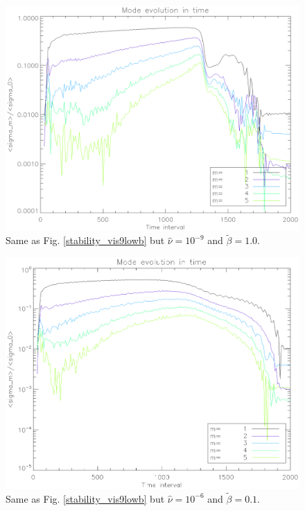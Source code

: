 \begin{figure}
   \includegraphics[scale=.42]{figures/stability_vis9betamed.ps}
   \caption{Same as Fig. \ref{stability_vis9lowb} but $\hat{\nu}=10^{-9}$ and $\tilde{\beta}=1.0$. }
 \label{stability_vis9medb)}
 \end{figure}

\begin{figure}
   \includegraphics[scale=.42]{figures/stability_vis6betalow.ps}
   \caption{Same as Fig. \ref{stability_vis9lowb} but $\hat{\nu}=10^{-6}$ and $\tilde{\beta}=0.1$. }
 \label{stability_vis6lowb)}
 \end{figure}

